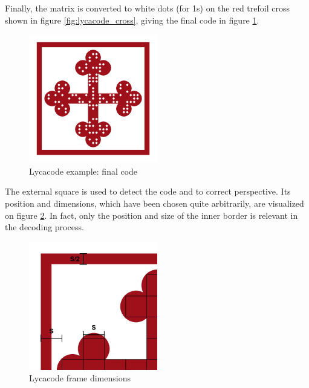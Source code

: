 Finally, the matrix is converted to white dots (for 1s) on the red trefoil cross shown in figure \ref{fig:lycacode_cross}, giving the final code in figure \ref{fig:lycacode_ex_final}.

\begin{figure}[H]
  \centering
  \includegraphics[width=0.5\textwidth]{images/lycacode_ex_final}
  \caption{Lycacode example: final code}
  \label{fig:lycacode_ex_final}
\end{figure}

The external square is used to detect the code and to correct perspective.
Its position and dimensions, which have been chosen quite arbitrarily, are visualized on figure \ref{fig:lycacode_frame}. In fact, only the position and size of the inner border is relevant in the decoding process.

\begin{figure}[H]
  \centering
  \includegraphics[width=0.5\textwidth]{images/lycacode_frame}
  \caption{Lycacode frame dimensions}
  \label{fig:lycacode_frame}
\end{figure}
